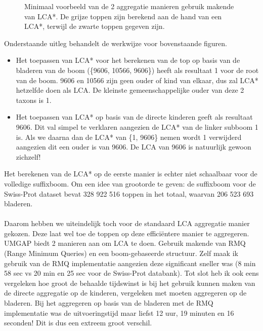 \begin{figure}[H]
    \centering
    \hspace{0.25\textwidth}%
    \caption{Minimaal voorbeeld van de 2 aggregatie manieren gebruik makende van LCA*. De grijze toppen zijn berekend aan de hand van een LCA*, terwijl de zwarte toppen gegeven zijn.}\label{fig:lca*_diff}
\end{figure}

Onderstaande uitleg behandelt de werkwijze voor bovenstaande figuren.
\begin{itemize}
    \item Het toepassen van LCA* voor het berekenen van de top op basis van de bladeren van de boom (\{9606, 10566, 9606\}) heeft als resultaat 1 voor de root van de boom.
    9606 en 10566 zijn geen ouder of kind van elkaar, dus zal LCA* hetzelfde doen als LCA\@.
    De kleinste gemeenschappelijke ouder van deze 2 taxons is 1.
    \item Het toepassen van LCA* op basis van de directe kinderen geeft als resultaat 9606.
    Dit val simpel te verklaren aangezien de LCA* van de linker subboom 1 is.
    Als we daarna dan de LCA* van \{1, 9606\} nemen wordt 1 verwijderd aangezien dit een ouder is van 9606.
    De LCA van 9606 is natuurlijk gewoon zichzelf!
\end{itemize}

Het berekenen van de LCA* op de eerste manier is echter niet schaalbaar voor de volledige suffixboom.
Om een idee van grootorde te geven: de suffixboom voor de Swiss-Prot dataset bevat 328 922 516 toppen in het totaal, waarvan 206 523 693 bladeren.
\\ \\
Daarom hebben we uiteindelijk toch voor de standaard LCA aggregatie manier gekozen.
Deze laat wel toe de toppen op deze efficiëntere manier te aggregeren.
UMGAP biedt 2 manieren aan om LCA te doen.
Gebruik makende van RMQ (Range Minimum Queries) en een boom-gebaseerde structuur.
Zelf maak ik gebruik van de RMQ implementatie aangezien deze significant sneller was (8 min 58 sec vs 20 min en 25 sec voor de Swiss-Prot databank).
Tot slot heb ik ook eens vergeleken hoe groot de behaalde tijdswinst is bij het gebruik kunnen maken van de directe aggregatie op de kinderen, vergeleken met moeten aggregeren op de bladeren.
Bij het aggregeren op basis van de bladeren met de RMQ implementatie was de uitvoeringstijd maar liefst 12 uur, 19 minuten en 16 seconden!
Dit is dus een extreem groot verschil.

